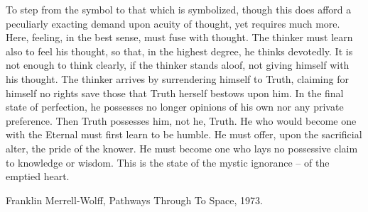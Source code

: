 \documentclass{article}
\theoremstyle{definition}
\theoremstyle{remark}
\theoremstyle{definition}
\theoremstyle{definition}
\theoremstyle{definition}
\begin{document}
\newpage
\epigraph{
	To step from the symbol to that which is symbolized, though this does afford a peculiarly exacting demand upon acuity of thought, yet requires much more. Here, feeling, in the best sense, must fuse with thought. The thinker must learn also to feel his thought, so that, in the highest degree, he thinks devotedly. It is not enough to think clearly, if the thinker stands aloof, not giving himself with his thought. The thinker arrives by surrendering himself to Truth, claiming for himself no rights save those that Truth herself bestows upon him. In the final state of perfection, he possesses no longer opinions of his own nor any private preference. Then Truth possesses him, not he, Truth. He who would become one with the Eternal must first learn to be humble. He must offer, upon the sacrificial alter, the pride of the knower. He must become one who lays no possessive claim to knowledge or wisdom. This is the state of the mystic ignorance -- of the emptied heart. }{Franklin Merrell-Wolff, Pathways Through To Space, 1973.}
\end{document}
